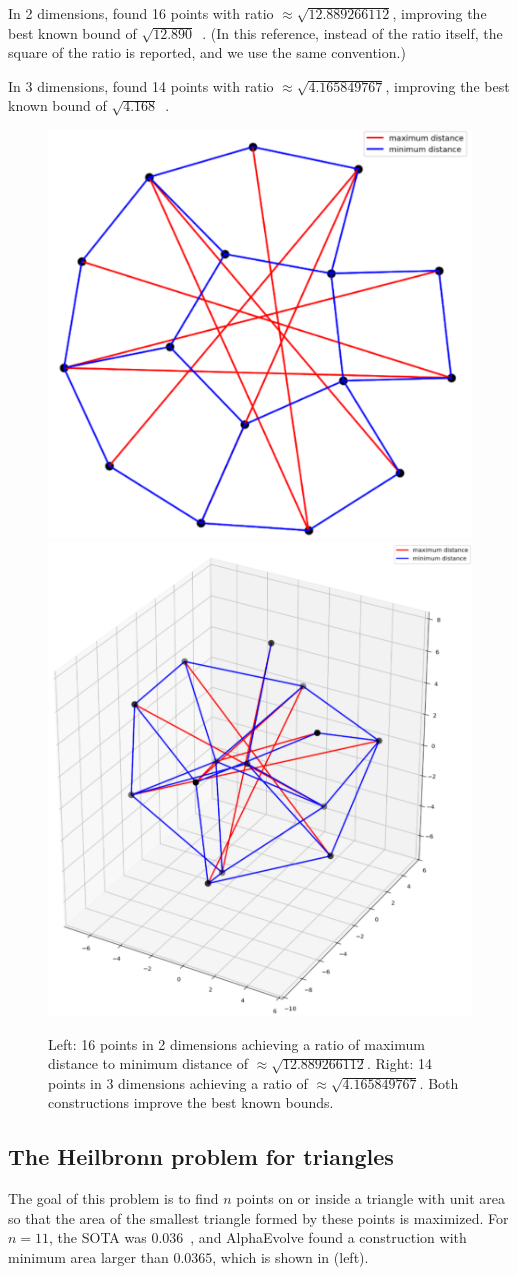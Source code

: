 In 2 dimensions, \method found 16 points with ratio $\approx \sqrt{12.889266112}$, improving the best known bound of $\sqrt{12.890}$~\citep{geometry_collection}.
(In this reference, instead of the ratio itself, the square of the ratio is reported, and we use the same convention.)
 
In 3 dimensions, \method found 14 points with ratio $\approx \sqrt{4.165849767}$, improving the best known bound of $\sqrt{4.168}$~\citep{geometry_collection}.

\begin{figure}
    \centering
    \includegraphics[width=0.45\linewidth]{figures/maxmin1.pdf}
    \includegraphics[width=0.45\linewidth]{figures/maxmin2.pdf}
    \caption{Left: 16 points in 2 dimensions achieving a ratio of maximum distance to minimum distance of
    $\approx \sqrt{12.889266112}$.     
    Right: 14 points in 3 dimensions achieving a ratio of $\approx \sqrt{4.165849767}$. Both constructions improve the best known bounds.}
    \label{fig:distance_ratios}
\end{figure}


\subsection{The Heilbronn problem for triangles}
The goal of this problem is to find $n$ points on or inside a triangle with unit area so that the area of the smallest triangle formed by these points is maximized. For $n=11$, the SOTA was $0.036$~\citep{geometry_collection}, and AlphaEvolve found a construction with minimum area larger than $0.0365$, which is shown in  (left). 

